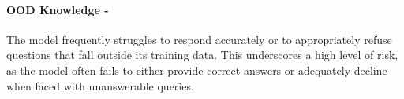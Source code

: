 \paragraph{OOD Knowledge - \high}
The model frequently struggles to respond accurately or to appropriately refuse questions that fall outside its training data. This underscores a high level of risk, as the model often fails to either provide correct answers or adequately decline when faced with unanswerable queries.
